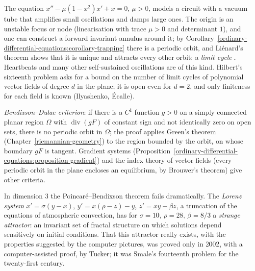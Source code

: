 \begin{example}\label{ordinary-differential-equations:example-van-der-pol}
The equation $x'' - \mu(1 - x^2)x' + x = 0$, $\mu > 0$, models a circuit with a vacuum tube that amplifies small oscillations and damps large ones. The origin is an unstable focus or node (linearisation with trace $\mu > 0$ and
determinant $1$), and one can construct a forward invariant annulus around it; by Corollary~\ref{ordinary-differential-equations:corollary-trapping} there is a periodic orbit, and Li\'enard's theorem shows that it is unique and attracts
every other orbit: a \emph{limit cycle} \cite{guckenheimer-holmes}. Heartbeats and many other self-sustained oscillations are of this kind. Hilbert's sixteenth problem asks for a bound on the number of limit cycles of polynomial
vector fields of degree $d$ in the plane; it is open even for $d = 2$, and only finiteness for each field is known (Ilyashenko, \'Ecalle).
\end{example}

\begin{remark}\label{ordinary-differential-equations:remark-dulac}
\emph{Bendixson--Dulac criterion}: if there is a $C^1$ function $g > 0$ on a simply connected planar region $\Omega$ with $\operatorname{div}(gF)$ of constant sign and not identically zero on open sets, there is no periodic orbit in $\Omega$;
the proof applies Green's theorem (Chapter~\ref{riemannian-geometry}) to the region bounded by the orbit, on whose boundary $gF$ is tangent. Gradient systems (Proposition~\ref{ordinary-differential-equations:proposition-gradient}) and the
index theory of vector fields (every periodic orbit in the plane encloses an equilibrium, by Brouwer's theorem) give other criteria.
\end{remark}

\begin{remark}\label{ordinary-differential-equations:remark-chaos-flows}
In dimension $3$ the Poincar\'e--Bendixson theorem fails dramatically. The \emph{Lorenz system} $x' = \sigma(y - x)$, $y' = x(\rho - z) - y$, $z' = xy - \beta z$, a truncation of the equations of atmospheric convection, has for
$\sigma = 10$, $\rho = 28$, $\beta = 8/3$ a \emph{strange attractor}: an invariant set of fractal structure on which solutions depend sensitively on initial conditions. That this attractor really exists, with the properties suggested by the
computer pictures, was proved only in 2002, with a computer-assisted proof, by Tucker; it was Smale's fourteenth problem for the twenty-first century.
\end{remark}

